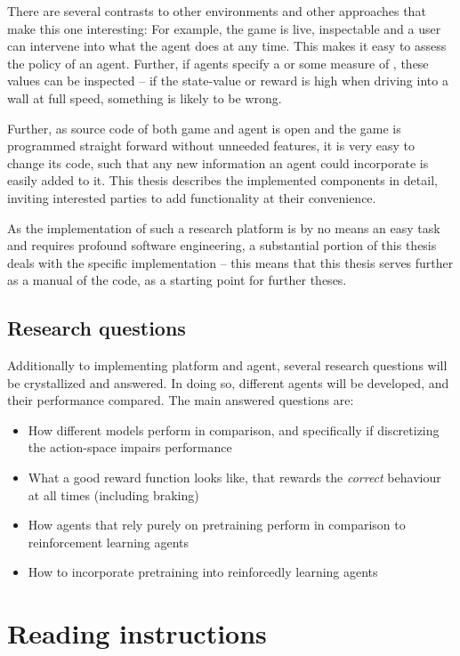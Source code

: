 There are several contrasts to other environments and other approaches that make this one interesting: For example, the game is live, inspectable and a user can intervene into what the agent does at any time. This makes it easy to assess the policy of an agent. Further, if agents specify a  or some measure of , these values can be inspected -- if the state-value or reward is high when driving into a wall at full speed, something is likely to be wrong.

Further, as source code of both game and agent is open and the game is programmed straight forward without unneeded features, it is very easy to change its code, such that any new information an agent could incorporate is easily added to it. This thesis describes the implemented components in detail, inviting interested parties to add functionality at their convenience.

As the implementation of such a research platform is by no means an easy task and requires profound software engineering, a substantial portion of this thesis deals with the specific implementation -- this means that this thesis serves further as a manual of the code, as a starting point for further theses.

\subsection{Research questions}

\label{sec:researchquestions}

Additionally to implementing platform and agent, several research questions will be crystallized and answered. In doing so, different agents will be developed, and their performance compared. The main answered questions are:
\begin{itemize}
	\item How different models perform in comparison, and specifically if discretizing the action-space impairs performance
	\item What a good reward function looks like, that rewards the \textit{correct} behaviour at all times (including braking)
	\item How agents that rely purely on pretraining perform in comparison to reinforcement learning agents
	\item How to incorporate pretraining into reinforcedly learning agents
\end{itemize}

\clearpage
\section{Reading instructions}

